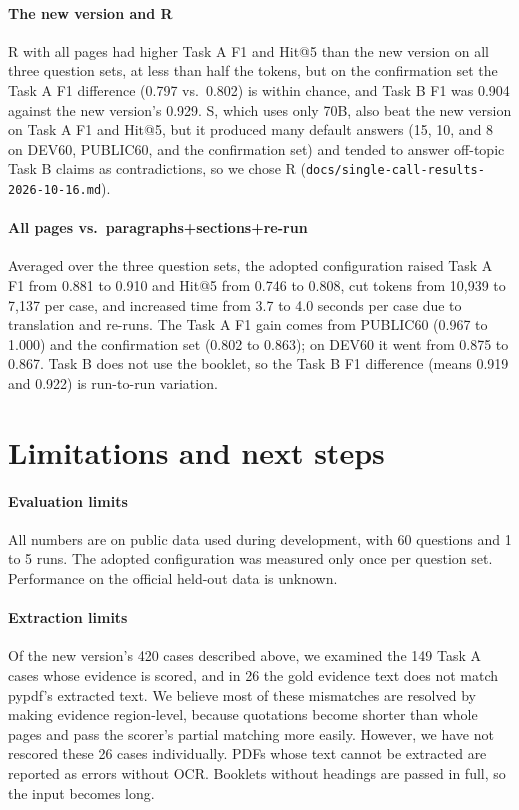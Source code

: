 \documentclass[10pt,a4paper]{article}
\begin{document}
\paragraph{The new version and R}
R with all pages had higher Task A F1 and Hit@5 than the new version on all three question sets, at less than half the tokens, but on the confirmation set the Task A F1 difference (0.797 vs.\ 0.802) is within chance, and Task B F1 was 0.904 against the new version's 0.929.
S, which uses only 70B, also beat the new version on Task A F1 and Hit@5, but it produced many default answers (15, 10, and 8 on DEV60, PUBLIC60, and the confirmation set) and tended to answer off-topic Task B claims as contradictions, so we chose R (\texttt{docs/single-call-results-2026-10-16.md}).

\paragraph{All pages vs.\ paragraphs+sections+re-run}
Averaged over the three question sets, the adopted configuration raised Task A F1 from 0.881 to 0.910 and Hit@5 from 0.746 to 0.808, cut tokens from 10,939 to 7,137 per case, and increased time from 3.7 to 4.0 seconds per case due to translation and re-runs.
The Task A F1 gain comes from PUBLIC60 (0.967 to 1.000) and the confirmation set (0.802 to 0.863); on DEV60 it went from 0.875 to 0.867. Task B does not use the booklet, so the Task B F1 difference (means 0.919 and 0.922) is run-to-run variation.

\section{Limitations and next steps}

\paragraph{Evaluation limits}
All numbers are on public data used during development, with 60 questions and 1 to 5 runs. The adopted configuration was measured only once per question set.
Performance on the official held-out data is unknown.

\paragraph{Extraction limits}
Of the new version's 420 cases described above, we examined the 149 Task A cases whose evidence is scored, and in 26 the gold evidence text does not match pypdf's extracted text.
We believe most of these mismatches are resolved by making evidence region-level, because quotations become shorter than whole pages and pass the scorer's partial matching more easily.
However, we have not rescored these 26 cases individually.
PDFs whose text cannot be extracted are reported as errors without OCR.
Booklets without headings are passed in full, so the input becomes long.
\end{document}
